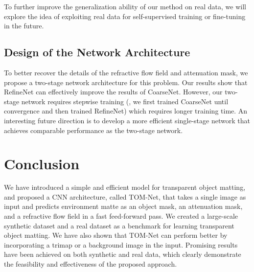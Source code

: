 To further improve the generalization ability of our method on real data, we will explore the idea of exploiting real data for self-supervised training or fine-tuning in the future.

\subsection{Design of the Network Architecture}
To better recover the details of the refractive flow field and attenuation mask, we propose a two-stage network architecture for this problem. 
Our results show that RefineNet can effectively improve the results of CoarseNet.
However, our two-stage network requires stepwise training (\ie, we first trained CoarseNet until convergence and then trained RefineNet) which requires longer training time.
An interesting future direction is to develop a more efficient single-stage network that achieves comparable performance as the two-stage network. 

\section{Conclusion}
\label{sec:conclusion}
We have introduced a simple and efficient model for transparent object matting, and proposed a CNN architecture, called TOM-Net, that takes a single image as input and predicts environment matte as an object mask, an attenuation mask, and a refractive flow field in a fast feed-forward pass. We created a large-scale synthetic dataset and a real dataset as a benchmark for learning transparent object matting. We have also shown that TOM-Net can perform better by incorporating a trimap or a background image in the input. Promising results have been achieved on both synthetic and real data, which clearly demonstrate the feasibility and effectiveness of the proposed approach. 
